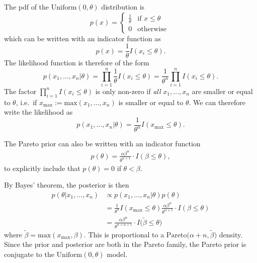 \documentclass[
  letterpaper,
  DIV=11,
  numbers=noendperiod]{scrartcl}
\begin{document}
\begin{tcolorbox}[enhanced jigsaw, coltitle=black, breakable, colbacktitle=quarto-callout-note-color!10!white, colframe=quarto-callout-note-color-frame, bottomrule=.15mm, toprule=.15mm, rightrule=.15mm, arc=.35mm, colback=white, opacityback=0, bottomtitle=1mm, leftrule=.75mm, title={Solution}, titlerule=0mm, toptitle=1mm, left=2mm, opacitybacktitle=0.6]

The pdf of the \(\mathrm{Uniform}(0,\theta)\) distribution is
\begin{equation*}
  p(x) = \begin{cases}
          \frac{1}{\theta}  & \text{if } x \leq  \theta \\
          0                 & \text{otherwise }
          \end{cases}
\end{equation*} which can be written with an indicator function as \[
p(x) = \frac{1}{\theta} I(x_i \leq \theta).
\] The likelihood function is therefore of the form \begin{equation*}
   p(x_1,\ldots,x_n\vert\theta) = \prod_{i=1}^n \frac{1}{\theta} I(x_i \leq \theta) = \frac{1}{\theta^n} \prod_{i=1}^n I(x_i \leq \theta).
\end{equation*} The factor \(\prod_{i=1}^n I(x_i \leq \theta)\) is only
non-zero if \emph{all} \(x_1,\ldots,x_n\) are smaller or equal to
\(\theta\), i.e.~if \(x_{\mathrm{max}} := \mathrm{max}(x_1, \dots,x_n)\)
is smaller or equal to \(\theta\). We can therefore write the likelihood
as \begin{equation*}
   p(x_1,\ldots,x_n\vert\theta) = \frac{1}{\theta^n}  I(x_{\mathrm{max}} \leq \theta).
\end{equation*}

The Pareto prior can also be written with an indicator function
\begin{align*}
    p(\theta) = \frac{\alpha \beta^\alpha }{\theta^{\alpha+1}}\cdot I(\beta \leq \theta),
\end{align*} to explicitly include that \(p(\theta)=0\) if
\(\theta < \beta\).

By Bayes' theorem, the posterior is then \begin{align*}
    p(\theta \vert x_1, \dots,x_n) &\propto p(x_1, \dots,x_n \vert \theta)p(\theta) \\
                       &= \frac{1}{\theta^n} I(x_{\mathrm{max}} \leq \theta)
                            \frac{\alpha \beta^\alpha }{\theta^{\alpha+1}}\cdot I(\beta \leq \theta) \\
                       &=  \frac{\alpha \beta^\alpha }{\theta^{n+\alpha+1}} \cdot  
                            I\big(\tilde \beta \leq \theta \big)        
\end{align*} where
\(\tilde \beta = \mathrm{max}(x_{\mathrm{max}},\beta)\). This is
proportional to a \(\mathrm{Pareto}\big(\alpha + n, \tilde \beta \big)\)
density. Since the prior and posterior are both in the Pareto family,
the Pareto prior is conjugate to the \(\mathrm{Uniform}(0,\theta)\)
model.

\end{tcolorbox}
\end{document}
